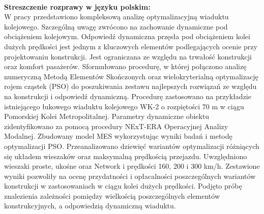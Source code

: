 \begin{myfont}
	\pagebreak[4]
	
	\thispagestyle{plain}
	\noindent
	\\
	\textbf{Streszczenie rozprawy w języku polskim:}\\
	W pracy przedstawiono kompleksową analizę optymalizacyjną wiaduktu kolejowego. Szczególną uwagę zwrócono na zachowanie dynamiczne pod obciążeniem kolejowym. Odpowiedź dynamiczna przęsła pod obciążeniem kolei dużych prędkości jest jednym z kluczowych elementów podlegających ocenie przy projektowaniu konstrukcji. Jest ograniczana ze względu na trwałość konstrukcji oraz komfort pasażerów. Sformułowano procedurę, w której połączono analizę numeryczną Metodą Elementów Skończonych oraz wielokryterialną optymalizację rojem cząstek (PSO) do poszukiwania zestawu najlepszych rozwiązań ze względu na  konstrukcji i odpowiedź dynamiczną. Procedurę zastosowano na przykładzie istniejącego łukowego wiaduktu kolejowego WK-2 o rozpiętości 70 m w ciągu Pomorskiej Kolei Metropolitalnej. Parametry dynamiczne obiektu zidentyfikowano za pomocą procedury NExT-ERA Operacyjnej Analizy Modalnej. Zbudowany model MES  wykorzystując wyniki badań i metodę optymalizacji PSO. Przeanalizowano dziewięć wariantów optymalizacji różniących się układem wieszaków oraz maksymalną prędkością przejazdu. Uwzględniono wieszaki proste, ukośne oraz Network i prędkości 160, 200 i 300 km/h. Zestawione wyniki pozwoliły na ocenę przydatności i opłacalności poszczególnych wariantów konstrukcji w zastosowaniach w ciągu kolei dużych prędkości. Podjęto próbę znalezienia zależności pomiędzy wielkością poszczególnych elementów konstrukcyjnych, a odpowiedzią dynamiczną wiaduktu.
	

\end{myfont}
